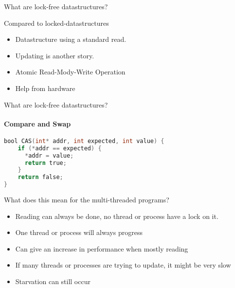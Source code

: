 \begin{frame}{What are lock-free datastructures?}
	\begin{block}{Compared to locked-datastructures}
		\begin{itemize}
			\item Datastructure using a standard \textcolor{ReneOrange}{read}.
			\item \textcolor{ReneOrange}{Updating} is another story.
			\item Atomic Read-Mody-Write Operation
			\item Help from hardware
		\end{itemize}
	\end{block}
\end{frame}

\begin{frame}[fragile]{What are lock-free datastructures?}
\framesubtitle{Compare and Swap}
\begin{lstlisting}[language=C,breaklines=true]
bool CAS(int* addr, int expected, int value) {
	if (*addr == expected) {
	  *addr = value;
	  return true;
	}
	return false;
} 
\end{lstlisting}
\end{frame}

\begin{frame}

	\begin{block}{What does this mean for the multi-threaded programs?}
		\begin{itemize}
			\item Reading can always be done, no thread or process have a \textcolor{ReneOrange}{lock} on it.
			\item One thread or process will always progress
			\item Can give an increase in performance when mostly reading
			\item If many threads or processes are trying to update, it might be very slow
			\item \textcolor{ReneOrange}{Starvation} can still occur
		\end{itemize}
	\end{block}
\end{frame}